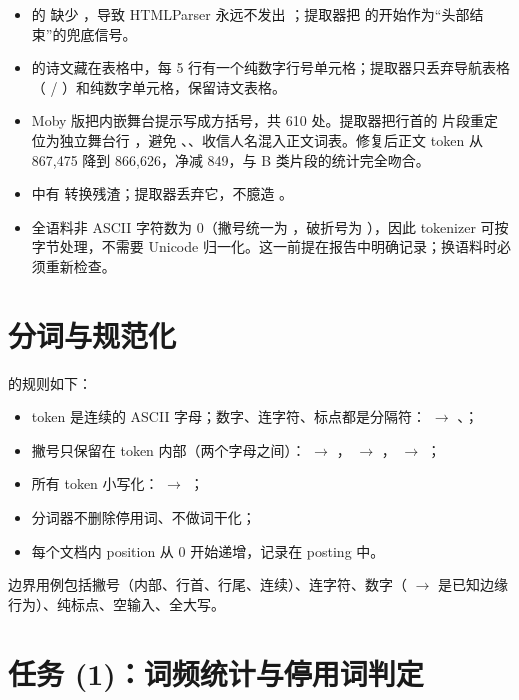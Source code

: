 \begin{itemize}
  \item {} 的  缺少 \code{>}，导致 HTMLParser 永远不发出 ；提取器把  的开始作为“头部结束”的兜底信号。
  \item {} 的诗文藏在表格中，每 5 行有一个纯数字行号单元格；提取器只丢弃导航表格（ / ）和纯数字单元格，保留诗文表格。
  \item Moby 版把内嵌舞台提示写成方括号，共 610 处。提取器把行首的 \code{[...]} 片段重定位为独立舞台行 ，避免 、、收信人名混入正文词表。修复后正文 token 从 867,475 降到 866,626，净减 849，与 B 类片段的统计完全吻合。
  \item {} 中有  转换残渣；提取器丢弃它，不臆造 。
  \item 全语料非 ASCII 字符数为 0（撇号统一为 ，破折号为 \code{--}），因此 tokenizer 可按字节处理，不需要 Unicode 归一化。这一前提在报告中明确记录；换语料时必须重新检查。
\end{itemize}

\section{分词与规范化}

 的规则如下：

\begin{itemize}
  \item token 是连续的 ASCII 字母；数字、连字符、标点都是分隔符： $\rightarrow$ 、；
  \item 撇号只保留在 token 内部（两个字母之间）： $\rightarrow$ ， $\rightarrow$ ， $\rightarrow$ ；
  \item 所有 token 小写化： $\rightarrow$ ；
  \item 分词器不删除停用词、不做词干化；
  \item 每个文档内 position 从 0 开始递增，记录在 posting 中。
\end{itemize}

边界用例包括撇号（内部、行首、行尾、连续）、连字符、数字（ $\rightarrow$  是已知边缘行为）、纯标点、空输入、全大写。

\section{任务 (1)：词频统计与停用词判定}

